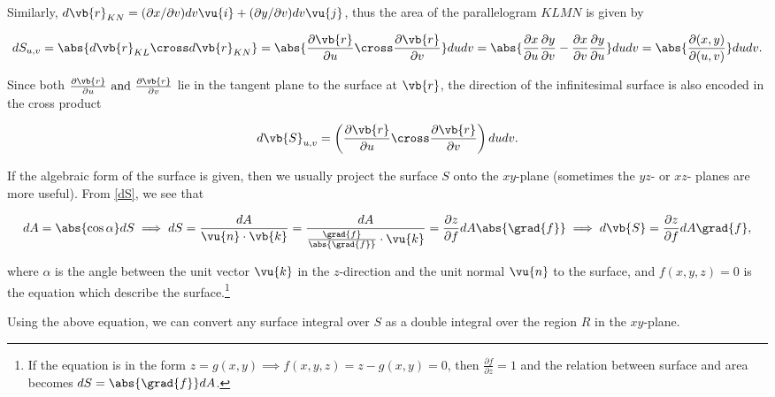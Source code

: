 \documentclass[english,a4paper,12pt]{report}
\begin{document}
Similarly, \(d\vb{r} _{KN}  = (\partial x / \partial v) dv \vu{i} + (\partial y/\partial v)dv \vu{j}\), thus the area of the parallelogram \(KLMN\) is given by

\begin{equation}
	dS_{u,v} = \abs{d\vb{r} _{KL} \cross  d\vb{r} _{KN}} = \abs{\frac{\partial \vb{r} }{\partial u} \cross \frac{\partial \vb{r} }{\partial v} }dudv = \abs{\frac{\partial x}{\partial u} \frac{\partial y}{\partial v}  - \frac{\partial x}{\partial v}  \frac{\partial y}{\partial u} }dudv = \abs{\frac{\partial (x,y)}{\partial (u,v)} } dudv.
\end{equation}

Since both \(\frac{\partial \vb{r} }{\partial u} \text { and } \frac{\partial \vb{r} }{\partial v}  \) lie in the tangent plane to the surface at \(\vb{r} \), the direction of the infinitesimal surface is also encoded in the cross product

\begin{equation}
	d\vb{S} _{u,v} =\left( \frac{\partial \vb{r} }{\partial u} \cross \frac{\partial \vb{r} }{\partial v} \right) dudv.   
\end{equation}



If the algebraic form of the surface is given, then we usually project the surface \(S\) onto the \(xy\)-plane (sometimes the \(yz\)- or \(xz\)- planes are more useful). From \cref{dS}, we see that 

\begin{equation} \label{dseq} 
	dA = \abs{\cos \alpha }dS \implies dS = \frac{dA}{\vu{n} \cdot \vb{k} } = \frac{dA}{\frac{\grad{f} }{\abs{\grad{f} } } \cdot \vu{k}  } =  \frac{\partial z}{\partial f}dA\abs{\grad{f} } \implies d\vb{S} = \frac{\partial z}{\partial f} dA\grad{f} , 
\end{equation}

where \(\alpha \) is the angle between the unit vector \(\vu{k} \) in the \(z\)-direction and the unit normal \(\vu{n} \) to the surface, and \(f(x,y,z)=0\) is the equation which describe the surface.\footnote{If the equation is in the form \(z = g(x,y) \implies f(x,y,z) = z-g(x,y) = 0\), then \(\frac{\partial f}{\partial z} = 1\) and the relation between surface and area becomes \(dS = \abs{\grad{f} }dA\).} 


Using the above equation, we can convert any surface integral over \(S\) as a double integral over the region \(R\) in the \(xy\)-plane.
\end{document}
